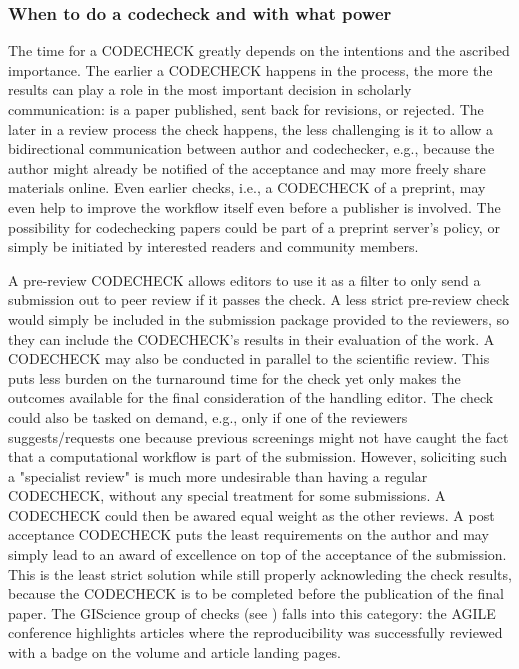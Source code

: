 \documentclass[12pt]{article}
\begin{document}
\subsubsection*{When to do a codecheck and with what power}
\label{when-to-do-a-codecheck}

The time for a CODECHECK greatly depends on the intentions and the ascribed
importance. The earlier a CODECHECK happens in the process, the more the
results can play a role in the most important decision in scholarly 
communication: is a paper published, sent back for revisions, or rejected.
The later in a review process the check happens, the less challenging is it
to allow a bidirectional communication between author and codechecker, e.g.,
because the author might already be notified of the acceptance and may more
freely share materials online.
Even earlier checks, i.e., a CODECHECK of a preprint, may even help to 
improve the workflow itself even before a publisher is involved. The 
possibility for codechecking papers could be part of a preprint server's
policy, or simply be initiated by interested readers and community members.

A pre-review CODECHECK allows editors to use it as a filter to only send 
a submission out to peer review if it passes the check. A less strict
pre-review check would simply be included in the submission package provided
to the reviewers, so they can include the CODECHECK's results in their 
evaluation of the work.
A CODECHECK may also be conducted in parallel to the scientific review. This
puts less burden on the turnaround time for the check yet only makes the 
outcomes available for the final consideration of the handling editor.
The check could also be tasked on demand, e.g., only if one of the reviewers
suggests/requests one because previous screenings might not have caught the 
fact that a computational workflow is part of the submission. However, 
soliciting such a "specialist review" is much more undesirable than having
a regular CODECHECK, without any special treatment for some submissions.
A CODECHECK could then be awared equal weight as the other reviews.
A post acceptance CODECHECK puts the least requirements on the author and may
simply lead to an award of excellence on top of the acceptance of the
submission. This is the least strict solution while still properly 
acknowleding the check results, because the CODECHECK is to be completed 
before the publication of the final paper.
The GIScience group of checks (see ) falls into this
category: the AGILE conference highlights articles where the reproducibility
was successfully reviewed with a badge on the volume and article landing
pages.
\end{document}
